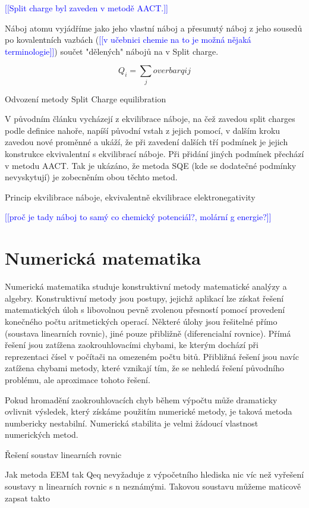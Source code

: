 \documentclass[
  color, %
  table, %
  lof,   %
  lot,   %
]{fithesis3}
\newcommand\todo[1]{\textcolor{blue}{[[#1]]}}
\begin{document}
\todo{Split charge byl zaveden v metodě AACT.}

Náboj atomu vyjádříme jako jeho vlastní náboj a přesunutý náboj z jeho sousedů po kovalentních vazbách (\todo{v učebnici chemie na to je možná nějaká terminologie}) součet "dělených" nábojů na v Split charge.

\[Q_i = \sum_j overbar qij\]

Odvození metody Split Charge equilibration

V původním článku vycházejí z ekvilibrace náboje, na čež zavedou split charges podle definice nahoře, napíší původní vstah z jejich pomocí, v dalším kroku zavedou nové proměnné a ukáží, že při zavedení dalších tří podmínek je jejich konstrukce ekvivalentní s ekvilibrací náboje. Při přidání jiných podmínek přechází v metodu AACT. Tak je ukázáno, že metoda SQE (kde se dodatečné podmínky nevyskytují) je zobecněním obou těchto metod.

Princip ekvilibrace náboje, ekvivalentně ekvilibrace elektronegativity

\todo{proč je tady náboj to samý co chemický potenciál?, molární g energie?}

\chapter{Numerická matematika}

Numerická matematika studuje konstruktivní metody matematické analýzy a algebry. Konstruktivní metody jsou postupy, jejichž aplikací lze získat řešení matematických úloh s libovolnou pevně zvolenou přesností pomocí provedení konečného počtu aritmetických operací. Některé úlohy jsou řešitelné přímo (soustava linearních rovnic), jiné pouze přibližně (diferencialní rovnice). Přímá řešení jsou zatížena zaokrouhlovacími chybami, ke kterým dochází při reprezentaci čísel v počítači na omezeném počtu bitů. Přibližná řešení jsou navíc zatížena chybami metody, které vznikají tím, že se nehledá řešení původního problému, ale aproximace tohoto řešení. \citep[s.~147]{černá1987základy}

Pokud hromadění zaokrouhlovacích chyb během výpočtu může dramaticky ovlivnit výsledek, který získáme použitím numerické metody, je taková metoda numbericky nestabilní. Numerická stabilita je velmi žádoucí vlastnost numerických metod. \citep[s.~151]{černá1987základy}

Řešení soustav linearních rovnic

Jak metoda EEM tak Qeq nevyžaduje z výpočetního hlediska nic víc než vyřešení soustavy n linearních rovnic s n neznámými. Takovou soustavu můžeme maticově zapsat takto
\end{document}
